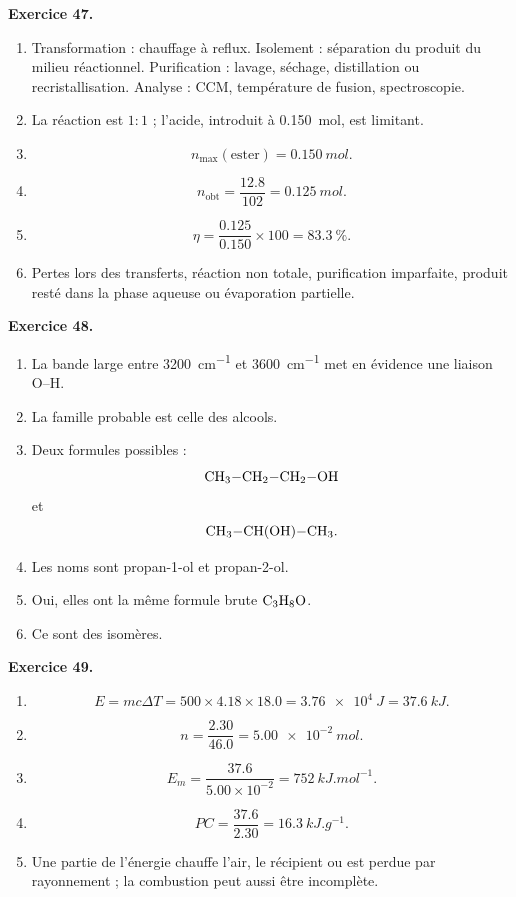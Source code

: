 \documentclass[11pt,a4paper]{article}
\newcommand{\corr}[2]{
  \begin{correctionbox}
  \textbf{Exercice #1.} #2
  \end{correctionbox}
}
\begin{document}
\corr{47}{
\begin{enumerate}
  \item Transformation : chauffage à reflux. Isolement : séparation du produit du milieu réactionnel. Purification : lavage, séchage, distillation ou recristallisation. Analyse : CCM, température de fusion, spectroscopie.
  \item La réaction est $1:1$ ; l'acide, introduit à \SI{0.150}{mol}, est limitant.
  \item
  \[
  n_{\max}(\text{ester})=\SI{0.150}{mol}.
  \]
  \item
  \[
  n_{\text{obt}}=\frac{12.8}{102}=\SI{0.125}{mol}.
  \]
  \item
  \[
  \eta=\frac{0.125}{0.150}\times 100=\SI{83.3}{\percent}.
  \]
  \item Pertes lors des transferts, réaction non totale, purification imparfaite, produit resté dans la phase aqueuse ou évaporation partielle.
\end{enumerate}
}

\corr{48}{
\begin{enumerate}
  \item La bande large entre \SI{3200}{cm^{-1}} et \SI{3600}{cm^{-1}} met en évidence une liaison O--H.
  \item La famille probable est celle des alcools.
  \item Deux formules possibles :
  \[
  \ce{CH3-CH2-CH2-OH}
  \]
  et
  \[
  \ce{CH3-CH(OH)-CH3}.
  \]
  \item Les noms sont propan-1-ol et propan-2-ol.
  \item Oui, elles ont la même formule brute $\ce{C3H8O}$.
  \item Ce sont des isomères.
\end{enumerate}
}

\corr{49}{
\begin{enumerate}
  \item
  \[
  E=m c \Delta T=500\times 4.18\times 18.0
  =\SI{3.76e4}{J}=\SI{37.6}{kJ}.
  \]
  \item
  \[
  n=\frac{2.30}{46.0}=\SI{5.00e-2}{mol}.
  \]
  \item
  \[
  E_m=\frac{37.6}{5.00\times 10^{-2}}=\SI{752}{kJ.mol^{-1}}.
  \]
  \item
  \[
  PC=\frac{37.6}{2.30}=\SI{16.3}{kJ.g^{-1}}.
  \]
  \item Une partie de l'énergie chauffe l'air, le récipient ou est perdue par rayonnement ; la combustion peut aussi être incomplète.
\end{enumerate}
}
\end{document}
